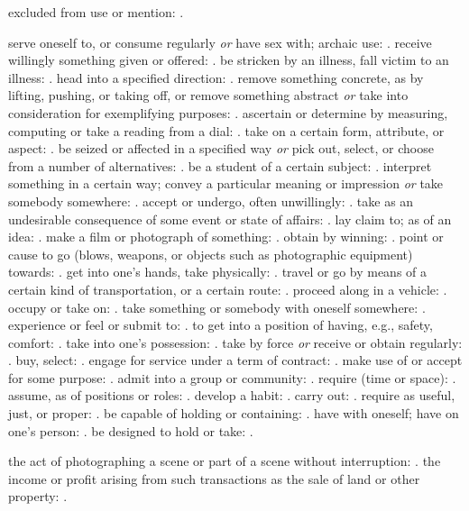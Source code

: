   excluded from use or mention: .

  serve oneself to, or consume regularly \textit{or} have sex with; archaic use: . receive willingly something given or offered: . be stricken by an illness, fall victim to an illness: . head into a specified direction: . remove something concrete, as by lifting, pushing, or taking off, or remove something abstract \textit{or} take into consideration for exemplifying purposes: . ascertain or determine by measuring, computing or take a reading from a dial: . take on a certain form, attribute, or aspect: . be seized or affected in a specified way \textit{or} pick out, select, or choose from a number of alternatives: . be a student of a certain subject: . interpret something in a certain way; convey a particular meaning or impression \textit{or} take somebody somewhere: . accept or undergo, often unwillingly: . take as an undesirable consequence of some event or state of affairs: . lay claim to; as of an idea: . make a film or photograph of something: . obtain by winning: . point or cause to go (blows, weapons, or objects such as photographic equipment) towards: . get into one's hands, take physically: . travel or go by means of a certain kind of transportation, or a certain route: . proceed along in a vehicle: . occupy or take on: . take something or somebody with oneself somewhere: . experience or feel or submit to: . to get into a position of having, e.g., safety, comfort: . take into one's possession: . take by force \textit{or} receive or obtain regularly: . buy, select: . engage for service under a term of contract: . make use of or accept for some purpose: . admit into a group or community: . require (time or space): . assume, as of positions or roles: . develop a habit: . carry out: . require as useful, just, or proper: . be capable of holding or containing: . have with oneself; have on one's person: . be designed to hold or take: .

  the act of photographing a scene or part of a scene without interruption: . the income or profit arising from such transactions as the sale of land or other property: .

